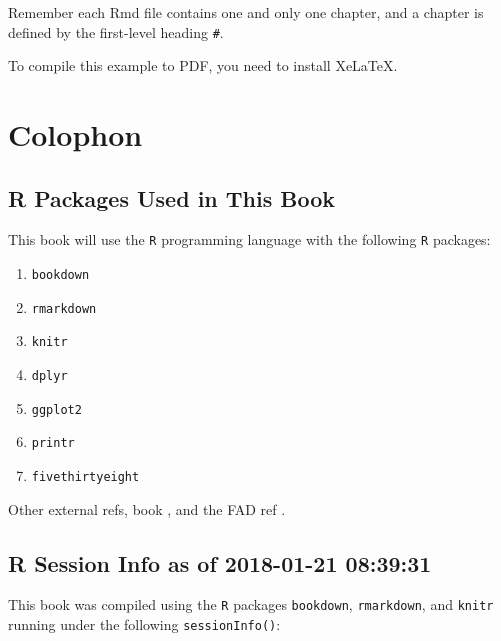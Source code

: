 \documentclass[]{book}
\providecommand{\tightlist}{%
  \setlength{\itemsep}{0pt}\setlength{\parskip}{0pt}}
\theoremstyle{definition}
\theoremstyle{definition}
\theoremstyle{definition}
\theoremstyle{remark}
\begin{document}
Remember each Rmd file contains one and only one chapter, and a chapter
is defined by the first-level heading \texttt{\#}.

To compile this example to PDF, you need to install XeLaTeX.

\section*{Colophon}\label{colophon}

\subsection*{R Packages Used in This
Book}\label{r-packages-used-in-this-book}

This book will use the \texttt{R} programming language \citep{R-base}
with the following \texttt{R} packages:

\begin{enumerate}
\def\labelenumi{\arabic{enumi}.}
\tightlist
\item
  \texttt{bookdown} \citep{R-bookdown}
\item
  \texttt{rmarkdown} \citep{R-rmarkdown}
\item
  \texttt{knitr} \citep{R-knitr}
\item
  \texttt{dplyr} \citep{R-dplyr}
\item
  \texttt{ggplot2} \citep{R-ggplot2}
\item
  \texttt{printr} \citep{R-printr}
\item
  \texttt{fivethirtyeight} \citep{R-fivethirtyeight}
\end{enumerate}

Other external refs, book \citep{xie2015}, and the FAD ref
\citep{Miller_Epstein_Bishop_Keitner_1985}.

\subsection*{R Session Info as of 2018-01-21
08:39:31}\label{r-session-info-as-of-2018-01-21-083931}

This book was compiled using the \texttt{R} packages \texttt{bookdown},
\texttt{rmarkdown}, and \texttt{knitr} running under the following
\texttt{sessionInfo()}:
\end{document}
